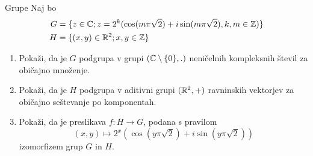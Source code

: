 \begin{frame}{Grupe}
	Naj bo
	\begin{align*}
		G &= \{z\in \mathbb{C}; z = 2^k(\cos(m\pi\sqrt{2}) + i \sin(m\pi\sqrt{2}), k, m\in \mathbb{Z})\}\\
		H &= \{(x, y)\in \mathbb{R}^2; x,y\in \mathbb{Z}\}
	\end{align*}
	
	\begin{enumerate}
		\item
			Pokaži, da je $G$ podgrupa v grupi $(\mathbb{C} \setminus \{0\},. )$
			neničelnih kompleksnih števil za običajno množenje.
		\item
			Pokaži, da je $H$ podgrupa v aditivni grupi $(\mathbb{R}^2, +)$
			ravninskih vektorjev za običajno seštevanje po komponentah.
		\item
			Pokaži, da je preslikava $f:H\to G$, podana s pravilom
			$$(x, y)\mapsto 2^x(\cos(y\pi\sqrt{2})+ i \sin(y\pi\sqrt{2}))$$
			izomorfizem grup $G$ in $H$.
	\end{enumerate}
\end{frame}
